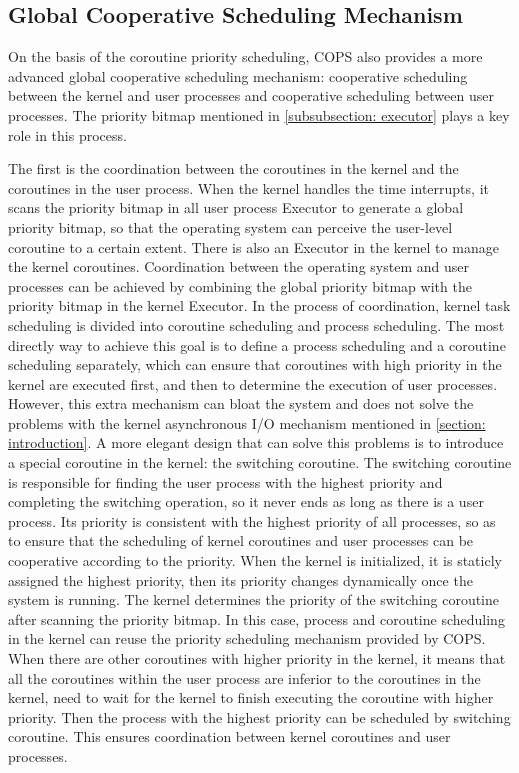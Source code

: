 \documentclass[sigconf,review,anonymous]{acmart}
\begin{document}
\subsection{Global Cooperative Scheduling Mechanism}
\label{section: global-cooperative-scheduling}

On the basis of the coroutine priority scheduling, COPS also provides a more advanced global cooperative scheduling mechanism: cooperative scheduling between the kernel and user processes and cooperative scheduling between user processes. The priority bitmap mentioned in \ref{subsubsection: executor} plays a key role in this process.

The first is the coordination between the coroutines in the kernel and the coroutines in the user process. When the kernel handles the time interrupts, it scans the priority bitmap in all user process Executor to generate a global priority bitmap, so that the operating system can perceive the user-level coroutine to a certain extent. There is also an Executor in the kernel to manage the kernel coroutines. Coordination between the operating system and user processes can be achieved by combining the global priority bitmap with the priority bitmap in the kernel Executor. In the process of coordination, kernel task scheduling is divided into coroutine scheduling and process scheduling. The most directly way to achieve this goal is to define a process scheduling and a coroutine scheduling separately, which can ensure that coroutines with high priority in the kernel are executed first, and then to determine the execution of user processes. However, this extra mechanism can bloat the system and does not solve the problems with the kernel asynchronous I/O mechanism mentioned in \ref{section: introduction}. A more elegant design that can solve this problems is to introduce a special coroutine in the kernel: the switching coroutine. The switching coroutine is responsible for finding the user process with the highest priority and completing the switching operation, so it never ends as long as there is a user process. Its priority is consistent with the highest priority of all processes, so as to ensure that the scheduling of kernel coroutines and user processes can be cooperative according to the priority. When the kernel is initialized, it is staticly assigned the highest priority, then its priority changes dynamically once the system is running. The kernel determines the priority of the switching coroutine after scanning the priority bitmap. In this case, process and coroutine scheduling in the kernel can reuse the priority scheduling mechanism provided by COPS. When there are other coroutines with higher priority in the kernel, it means that all the coroutines within the user process are inferior to the coroutines in the kernel, need to wait for the kernel to finish executing the coroutine with higher priority. Then the process with the highest priority can be scheduled by switching coroutine. This ensures coordination between kernel coroutines and user processes.
\end{document}
